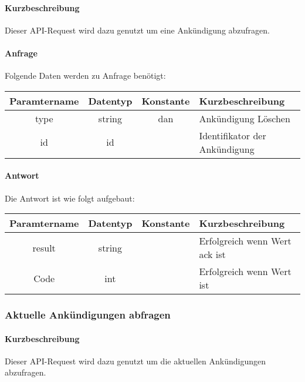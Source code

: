 \paragraph{Kurzbeschreibung}Dieser API-Request wird dazu genutzt um eine Ankündigung abzufragen.
\paragraph{Anfrage}Folgende Daten werden zu Anfrage benötigt:
\begin{table}[H]
	\begin{tabular}{|c|c|c|p{6.5cm}|}
		\hline
		\textbf{Paramtername} & \textbf{Datentyp} & \textbf{Konstante} & \textbf{Kurzbeschreibung}                                                                                               \\ \hline
		type                & string            & dan                & Ankündigung Löschen \\ \hline
		id                  & id                &                    & Identifikator der Ankündigung \\ \hline
	\end{tabular}
\end{table}
\paragraph{Antwort}Die Antwort ist wie folgt aufgebaut:
\begin{table}[H]
	\begin{tabular}{|c|c|c|p{6.5cm}|}
		\hline
		\textbf{Paramtername} & \textbf{Datentyp} & \textbf{Konstante} & \textbf{Kurzbeschreibung}                                                                                               \\ \hline
		result              & string           &                 & Erfolgreich wenn Wert {\glqq ack\grqq} ist \\ \hline
		Code                & int              &                 & Erfolgreich wenn Wert {\glqq 0\grqq} ist \\ \hline
	\end{tabular}
\end{table}
\subsubsection{Aktuelle Ankündigungen abfragen}
\paragraph{Kurzbeschreibung}Dieser API-Request wird dazu genutzt um die aktuellen Ankündigungen abzufragen.
